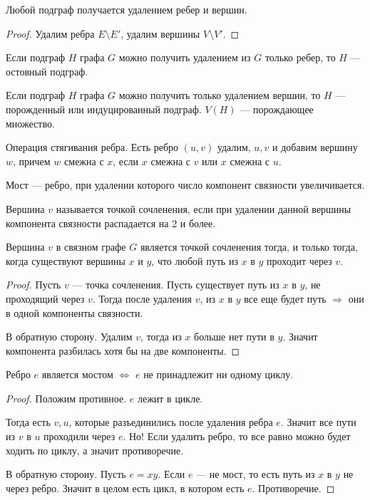 \begin{statement}
    Любой подграф получается удалением ребер и вершин.
\end{statement}
\begin{proof}
    Удалим ребра $E \setminus E'$, удалим вершины  $V \setminus V'$. 
\end{proof}
\begin{definition}
    Если подграф $H$ графа  $G$ можно получить удалением из  $G$ только ребер, то  $H$ --- остовный подграф.
\end{definition}
\begin{definition}
    Если подграф $H$ графа  $G$ можно получить только удалением вершин, то  $H$ --- порожденный или индуцированный подграф.  $V(H)$ --- порождающее множество.
\end{definition}
\begin{definition}
    Операция стягивания ребра. Есть ребро $(u, v)$ удалим, $u, v$ и добавим вершину  $w$, причем  $w$ смежна с  $x$, если  $x$ смежна с  $v$ или  $x$ смежна с  $u$.
\end{definition}
\begin{definition}
    Мост --- ребро, при удалении которого число компонент связности увеличивается.
\end{definition}
\begin{definition}
    Вершина $v$ называется точкой сочленения, если при удалении данной вершины компонента связности распадается на 2 и более.
\end{definition}
\begin{statement}
    Вершина $v$ в связном графе  $G$ является точкой сочленения тогда, и только тогда, когда существуют вершины  $x$ и  $y$, что любой путь из  $x$ в  $y$ проходит через $v$.
\end{statement}
\begin{proof}
    Пусть $v$ --- точка сочленения. Пусть существует путь из  $x$ в  $y$, не проходящий через  $v$. Тогда после удаления  $v$, из  $x$ в  $y$ все еще будет путь  $\Rightarrow$ они в одной компоненты связности.

    В обратную сторону. Удалим $v$, тогда из  $x$ больше нет пути в  $y$. Значит компонента разбилась хотя бы на две компоненты.
\end{proof}
\begin{statement}
    Ребро $e$ является мостом  $\iff$  $e$ не принадлежит ни одному циклу.
\end{statement}
\begin{proof}
    Положим противное. $e$ лежит в цикле. 

    Тогда есть $v, u$, которые разъединились после удаления ребра $e$. Значит все пути из  $v$ в $u$ проходили через  $e$. Но! Если удалить ребро, то все равно можно будет ходить по циклу, а значит противоречие.

    В обратную сторону. Пусть $e=xy$. Если  $e$ --- не мост, то есть путь из  $x$ в  $y$ не через ребро. Значит в целом есть цикл, в котором есть $e$. Противоречие. 
\end{proof}
